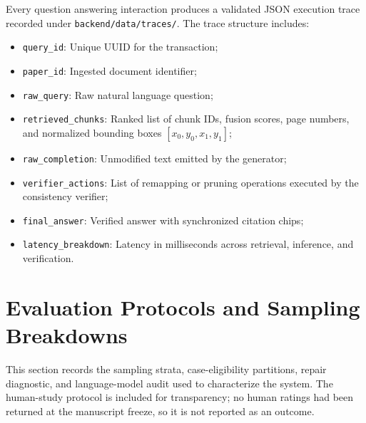 Every question answering interaction produces a validated JSON execution trace recorded under \texttt{backend/data/traces/}. The trace structure includes:
\begin{itemize}[leftmargin=*,itemsep=1pt,topsep=2pt]
    \item \texttt{query\_id}: Unique UUID for the transaction;
    \item \texttt{paper\_id}: Ingested document identifier;
    \item \texttt{raw\_query}: Raw natural language question;
    \item \texttt{retrieved\_chunks}: Ranked list of chunk IDs, fusion scores, page numbers, and normalized bounding boxes $[x_0, y_0, x_1, y_1]$;
    \item \texttt{raw\_completion}: Unmodified text emitted by the generator;
    \item \texttt{verifier\_actions}: List of remapping or pruning operations executed by the consistency verifier;
    \item \texttt{final\_answer}: Verified answer with synchronized citation chips;
    \item \texttt{latency\_breakdown}: Latency in milliseconds across retrieval, inference, and verification.
\end{itemize}

\section{Evaluation Protocols and Sampling Breakdowns}
\label{app:protocols}

This section records the sampling strata, case-eligibility partitions, repair diagnostic, and language-model audit used to characterize the system. The human-study protocol is included for transparency; no human ratings had been returned at the manuscript freeze, so it is not reported as an outcome.

\begin{table}[h]
\centering
{}
\caption{\textbf{Stratified Sampling Breakdown of the 50-Question Human Evaluation}. Five independent raters evaluate the same 50 questions across 10 papers ($n=250$ total ratings planned).}
\label{tab:human_50_protocol}
\end{table}


